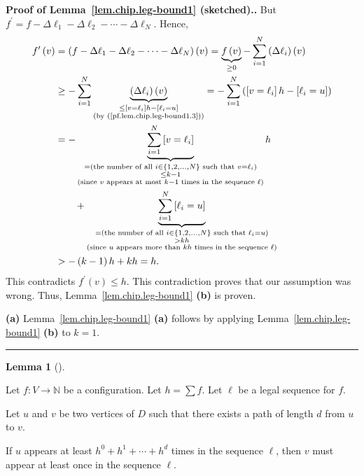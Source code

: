 \documentclass[numbers=enddot,12pt,final,onecolumn,notitlepage]{scrartcl}%
\theoremstyle{definition}
\newtheorem{lem}[theo]{Lemma}
\newenvironment{lemma}[1][]
{\begin{lem}[#1]\begin{leftbar}}
{\end{leftbar}\end{lem}}
\newenvironment{proof}[1][Proof]{\noindent\textbf{#1.} }{\ \rule{0.5em}{0.5em}}
\let\sumnonlimits\sum
\renewcommand{\sum}{\sumnonlimits\limits}
\newcommand{\NN}{\mathbb{N}}
\begin{document}
\begin{proof}[Proof of Lemma~\ref{lem.chip.leg-bound1} (sketched).]
But $f^{\prime}=f-\Delta\ell_{1}-\Delta\ell_{2}-\cdots-\Delta\ell_{N}$.
Hence,
\begin{align*}
f^{\prime}\left(  v\right)   &  =\left(  f-\Delta\ell_{1}-\Delta\ell
_{2}-\cdots-\Delta\ell_{N}\right)  \left(  v\right)  =\underbrace{f\left(
v\right)  }_{\geq0}-\sum_{i=1}^{N}\left(  \Delta\ell_{i}\right)  \left(
v\right) \\
&\geq -\sum_{i=1}^{N}\underbrace{\left(  \Delta\ell_{i}\right)  \left(
v\right)  }_{\substack{\leq\left[  v=\ell_{i}\right]  h-\left[  \ell
_{i}=u\right]  \\\text{(by (\ref{pf.lem.chip.leg-bound1.3}))}}}
 =-\sum_{i=1}^{N}\left(  \left[  v=\ell_{i}\right]  h-\left[  \ell
_{i}=u\right]  \right)  \\
&  =-\underbrace{\sum_{i=1}^{N}\left[  v=\ell_{i}\right]  }%
_{\substack{=\left(  \text{the number of all }i\in\left\{  1,2,\ldots
,N\right\}  \text{ such that }v=\ell_{i}\right)  \\\leq k-1\\\text{(since
}v\text{ appears at most }k-1\text{ times in the sequence }\ell\text{)}}}h\\
&  \qquad +\underbrace{\sum_{i=1}^{N}\left[  \ell_{i}=u\right]
}_{\substack{=\left(  \text{the number of all }i\in\left\{  1,2,\ldots
,N\right\}  \text{ such that }\ell_{i}=u\right)  \\>kh\\\text{(since }u\text{
appears more than }kh\text{ times in the sequence }\ell\text{)}}}\\
&  >-\left(  k-1\right)  h+kh=h.
\end{align*}
This contradicts $f^{\prime}\left(  v\right)  \leq h$. This contradiction
proves that our assumption was wrong. Thus, Lemma~\ref{lem.chip.leg-bound1}
\textbf{(b)} is proven.

\textbf{(a)} Lemma~\ref{lem.chip.leg-bound1} \textbf{(a)} follows by applying
Lemma~\ref{lem.chip.leg-bound1} \textbf{(b)} to $k=1$.
\end{proof}

\begin{lemma} \label{lem.chip.leg-bound1b}
Let $f : V \to \NN$ be a configuration.
Let $h = \sum f$.
Let $\ell$ be a legal sequence for $f$.

Let $u$ and $v$ be two vertices of $D$ such that there exists
a path of length $d$ from $u$ to $v$.

If $u$ appears at least $h^0 + h^1 + \cdots + h^d$
times in the sequence $\ell$,
then $v$ must appear at least once in the sequence $\ell$.
\end{lemma}
\end{document}
